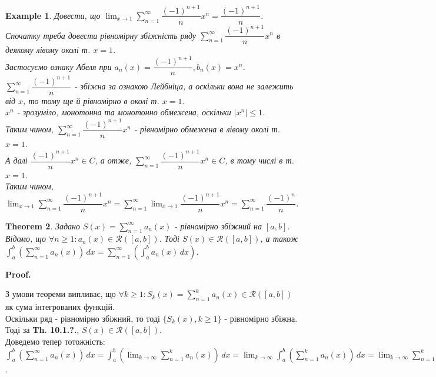 \documentclass[a4paper, 10pt]{article}
\makeatletter
\def\huge{\displaystyle}
\def\qed{$\blacksquare$}
\theoremstyle{theoremdd}
\newtheorem{theorem}{Theorem}[subsection]
\theoremstyle{theoremdd}
\theoremstyle{theoremdd}
\theoremstyle{theoremdd}
\newtheorem{example}[theorem]{Example}
\theoremstyle{theoremdd}
\theoremstyle{theoremdd}
\theoremstyle{theoremdd}
\theoremstyle{theoremdd}
\renewenvironment{proof}[1][Proof.\\]{\par
\pushQED{\hfill \qed}%
\normalfont \topsep6\p@\@plus6\p@\relax
\trivlist
\item\relax
{\bfseries
#1\@addpunct{.}}\hspace\labelsep\ignorespaces
}{%
\popQED\endtrivlist\@endpefalse
}
\makeatother
\begin{document}
\begin{example}
Довести, що $\huge\lim_{x \to 1} \huge\sum_{n=1}^\infty \dfrac{(-1)^{n+1}}{n}x^n = \dfrac{(-1)^{n+1}}{n}$.\\
Спочатку треба довести рівномірну збіжність ряду $\huge\sum_{n=1}^\infty \dfrac{(-1)^{n+1}}{n} x^n$ в деякому лівому околі т. $x = 1$.\\
Застосуємо ознаку Абеля при $a_n(x) = \dfrac{(-1)^{n+1}}{n}, b_n(x) = x^n$.\\
$\huge\sum_{n=1}^\infty \dfrac{(-1)^{n+1}}{n}$ - збіжна за ознакою Лейбніца, а оскільки вона не залежить від $x$, то тому ще й рівномірно в околі т. $x = 1$.\\
$x^n$ - зрозуміло, монотонна та монотонно обмежена, оскільки $|x^n| \leq 1$.\\
Таким чином, $\huge\sum_{n=1}^\infty \dfrac{(-1)^{n+1}}{n} x^n$ - рівномірно обмежена в лівому околі т. $x=1$.\\
А далі $\dfrac{(-1)^{n+1}}{n} x^{n} \in C$, а отже, $\huge\sum_{n=1}^\infty \dfrac{(-1)^{n+1}}{n}x^n \in C$, в тому числі в т. $x=1$.\\
Таким чином, $\huge\lim_{x \to 1} \huge\sum_{n=1}^\infty \dfrac{(-1)^{n+1}}{n}x^n = \huge\sum_{n=1}^\infty \lim_{x \to 1}\dfrac{(-1)^{n+1}}{n}x^n = \sum_{n=1}^\infty \dfrac{(-1)^n}{n}$.
\end{example}


\begin{theorem}
Задано $S(x) = \huge \sum_{n=1}^\infty a_n(x)$ - рівномірно збіжний на $[a,b]$.\\
Відомо, що $\forall n \geq 1: a_n(x) \in \mathcal{R}([a,b])$. Тоді $S(x) \in \mathcal{R}([a,b])$, а також\\
$\huge \int_a^b \left( \sum_{n=1}^\infty a_n(x) \right) \,dx = \sum_{n=1}^\infty \left( \int_a^b a_n(x)\,dx \right)$.
\end{theorem}

\begin{proof}
З умови теореми випливає, що $\forall k \geq 1: S_k(x) = \huge \sum_{n=1}^k a_n(x) \in \mathcal{R}([a,b])$ як сума інтегрованих функцій.\\
Оскільки ряд - рівномірно збіжний, то тоді $\{S_k(x), k \geq 1\}$ - рівномірно збіжна. Тоді за \textbf{Th. 10.1.?.}, $S(x) \in \mathcal{R}([a,b])$.\\
Доведемо тепер тотожність:\\
$\huge \int_a^b \left( \sum_{n=1}^\infty a_n(x) \right) \,dx = \int_a^b \left( \lim_{k \to \infty} \sum_{n=1}^k a_n(x) \right) \,dx = \lim_{k \to \infty} \int_a^b \left( \sum_{n=1}^k a_n(x) \right) \,dx = \lim_{k \to \infty} \sum_{n=1}^k \left( \int_a^b a_n(x)\,dx \right) = \sum_{n=1}^\infty \left( \int_a^b a_n(x)\,dx \right)$.
\end{proof}
\end{document}
